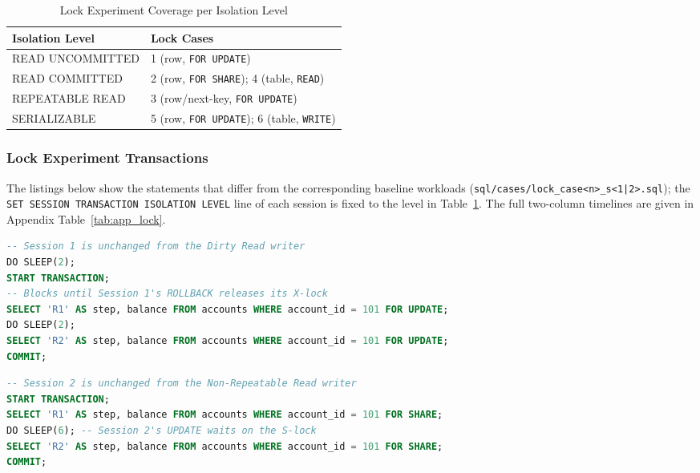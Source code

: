 \documentclass[sigconf, pbalance, nonacm]{acmart}
\begin{document}
\begin{table}[h]
\centering
\small
\caption{Lock Experiment Coverage per Isolation Level}
\label{tab:lock_coverage}
\begin{tabularx}{\columnwidth}{l X}
\toprule
\textbf{Isolation Level} & \textbf{Lock Cases} \\
\midrule
READ UNCOMMITTED & 1 (row, \texttt{FOR UPDATE}) \\
READ COMMITTED   & 2 (row, \texttt{FOR SHARE}); 4 (table, \texttt{READ}) \\
REPEATABLE READ  & 3 (row/next-key, \texttt{FOR UPDATE}) \\
SERIALIZABLE     & 5 (row, \texttt{FOR UPDATE}); 6 (table, \texttt{WRITE}) \\
\bottomrule
\end{tabularx}
\end{table}

\subsubsection{Lock Experiment Transactions}
The listings below show the statements that differ from the corresponding baseline workloads (\texttt{sql/cases/lock\_case<n>\_s<1|2>.sql}); the \texttt{SET SESSION TRANSACTION ISOLATION LEVEL} line of each session is fixed to the level in Table~\ref{tab:lock_coverage}. The full two-column timelines are given in Appendix Table~\ref{tab:app_lock}.

\begin{lstlisting}[language=SQL, caption={Lock Case 1: Session 2 Locking Read (READ UNCOMMITTED)}]
-- Session 1 is unchanged from the Dirty Read writer
DO SLEEP(2);
START TRANSACTION;
-- Blocks until Session 1's ROLLBACK releases its X-lock
SELECT 'R1' AS step, balance FROM accounts WHERE account_id = 101 FOR UPDATE;
DO SLEEP(2);
SELECT 'R2' AS step, balance FROM accounts WHERE account_id = 101 FOR UPDATE;
COMMIT;
\end{lstlisting}

\begin{lstlisting}[language=SQL, caption={Lock Case 2: Session 1 Shared Locking Read (READ COMMITTED)}]
-- Session 2 is unchanged from the Non-Repeatable Read writer
START TRANSACTION;
SELECT 'R1' AS step, balance FROM accounts WHERE account_id = 101 FOR SHARE;
DO SLEEP(6); -- Session 2's UPDATE waits on the S-lock
SELECT 'R2' AS step, balance FROM accounts WHERE account_id = 101 FOR SHARE;
COMMIT;
\end{lstlisting}
\end{document}
